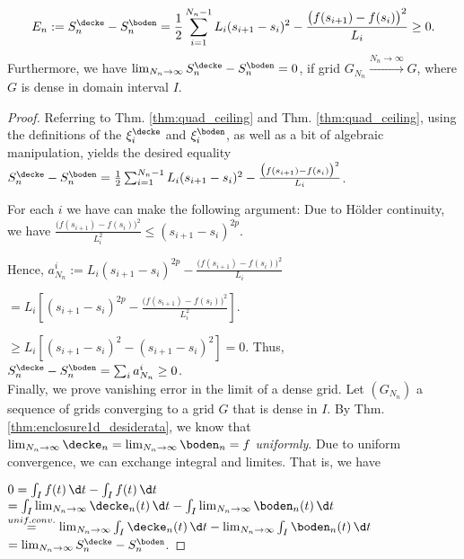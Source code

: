 \begin{thm}
\[E_n := S^\decke_n - S^\boden_n = \frac{1}{2} \sum_{i=1}^{{N_n}-1} L_i (s_{i+1} -s_i)^2 - \frac{\bigl(f(s_{i+1}) -f(s_i)\bigr)^2}{L_i} \geq 0.\] 
Furthermore, we have $\lim_{{N_n} \to \infty} S^\decke_n - S^\boden_n =0$, if grid $G_{N_n} \stackrel{{N_n} \to \infty}{\to} G$, where $G$ is dense in domain interval $I$. 

\begin{proof}


Referring to Thm. \ref{thm:quad_ceiling} and Thm. \ref{thm:quad_ceiling}, using the definitions of the $\xi^\decke_i$ and $\xi^\boden_i$, as well as a bit of algebraic manipulation, yields the desired equality 
$S^\decke_n - S^\boden_n = \frac{1}{2} \sum_{i=1}^{{N_n}-1} L_i (s_{i+1} -s_i)^2 - \frac{\bigl(f(s_{i+1}) -f(s_i)\bigr)^2}{L_i}$. 

For each $i$ we have can make the following argument:
Due to H\"older continuity, we have  
$\frac{\bigl(f(s_{i+1}) -f(s_i)\bigr)^2}{L_i^2}  \leq (s_{i+1}-s_i)^{2p}$.

Hence,
$a_{N_n}^i:=L_i (s_{i+1} -s_i)^{2p} - \frac{\bigl(f(s_{i+1}) -f(s_i)\bigr)^2}{L_i}$

$=L_i [(s_{i+1} -s_i)^{2p} - \frac{\bigl(f(s_{i+1}) -f(s_i)\bigr)^2}{L_i^2}]$.

$\geq L_i [(s_{i+1} -s_i)^2 - (s_{i+1} -s_i)^2] =0$.
Thus, $S^\decke_n - S^\boden_n = \sum_i a_{N_n}^i \geq 0$. \\

Finally, we prove vanishing error in the limit of a dense grid. 
Let $(G_{N_n})$ a sequence of grids converging to a grid $G$ that is dense in $I$. By Thm. \ref{thm:enclosure1d_desiderata}, we know that $\lim_{{N_n} \to \infty} \decke_n = \lim_{{N_n} \to \infty}
    \boden_n = f$ \textit{uniformly}. Due to uniform convergence, we can exchange integral and limites. That is, we have 

$0 = \int_I f(t) \, \d t - \int_I f(t) \, \d t$
$=  \int_I \lim_{{N_n} \to \infty} \decke_n(t) \, \d t  - \int_I \lim_{{N_n} \to \infty}  \boden_n (t) \, \d t$
$\stackrel{unif. conv.}{=} \lim_{{N_n} \to \infty} \int_I \decke_n(t) \, \d t  - \lim_{{N_n} \to \infty} \int_I \boden_n (t) \, \d t$    
$=\lim_{{N_n} \to \infty} S^\decke_n - S^\boden_n $.






\end{proof}

\end{thm}

